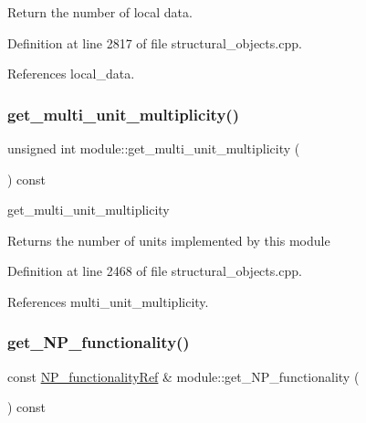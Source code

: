 Return the number of local data. 



Definition at line 2817 of file structural\+\_\+objects.\+cpp.



References local\+\_\+data.

\mbox{\label{classmodule_a1a7106047244348efb4c735a09a2c53c}} 
\subsubsection{\texorpdfstring{get\+\_\+multi\+\_\+unit\+\_\+multiplicity()}{get\_multi\_unit\_multiplicity()}}
{\footnotesize\ttfamily unsigned int module\+::get\+\_\+multi\+\_\+unit\+\_\+multiplicity (\begin{DoxyParamCaption}{ }\end{DoxyParamCaption}) const}



get\+\_\+multi\+\_\+unit\+\_\+multiplicity 

\begin{DoxyReturn}{Returns}
the number of units implemented by this module 
\end{DoxyReturn}


Definition at line 2468 of file structural\+\_\+objects.\+cpp.



References multi\+\_\+unit\+\_\+multiplicity.

\mbox{\label{classmodule_a9238b0f905edbc784f531f78cf2a78b0}} 
\subsubsection{\texorpdfstring{get\+\_\+\+N\+P\+\_\+functionality()}{get\_NP\_functionality()}}
{\footnotesize\ttfamily const \hyperlink{NP__functionality_8hpp_aacd74315d343c1054cd3c01e18627049}{N\+P\+\_\+functionality\+Ref} \& module\+::get\+\_\+\+N\+P\+\_\+functionality (\begin{DoxyParamCaption}{ }\end{DoxyParamCaption}) const}



